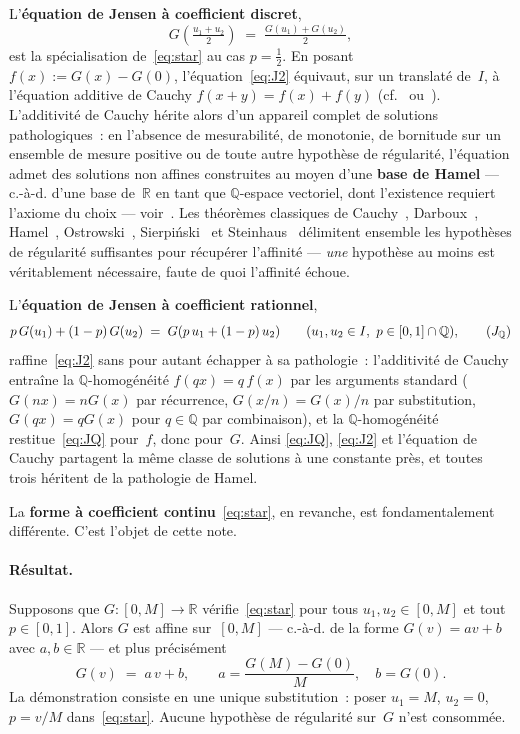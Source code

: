 \documentclass[11pt,a4paper]{amsart}
\newcommand{\R}{\mathbb R}
\newcommand{\Q}{\mathbb Q}
\begin{document}
L'\textbf{équation de Jensen à coefficient discret},
\begin{equation}
G\!\left(\tfrac{u_1 + u_2}{2}\right) \;=\;
\tfrac{G(u_1) + G(u_2)}{2},
\tag{$J_2$}\label{eq:J2}
\end{equation}
est la spécialisation de~\eqref{eq:star} au cas $p = \tfrac12$. En posant
$f(x) := G(x) - G(0)$, l'équation~\eqref{eq:J2} équivaut, sur un translaté
de~$I$, à l'équation additive de Cauchy $f(x + y) = f(x) + f(y)$
(cf.~\cite{Aczel1966} ou~\cite{Kuczma2009}). L'additivité de Cauchy hérite
alors d'un appareil complet de solutions pathologiques~: en l'absence de
mesurabilité, de monotonie, de bornitude sur un ensemble de mesure positive
ou de toute autre hypothèse de régularité, l'équation admet des solutions
non affines construites au moyen d'une \textbf{base de Hamel} --- c.-à-d.
d'une base de~$\R$ en tant que $\Q$-espace vectoriel, dont l'existence
requiert l'axiome du choix --- voir~\cite{Hamel1905}. Les théorèmes
classiques de Cauchy~\cite{Cauchy1821}, Darboux~\cite{Darboux1875},
Hamel~\cite{Hamel1905}, Ostrowski~\cite{Ostrowski1929},
Sierpiński~\cite{Sierpinski1920} et Steinhaus~\cite{Steinhaus1920}
délimitent ensemble les hypothèses de régularité suffisantes pour récupérer
l'affinité --- \emph{une} hypothèse au moins est véritablement nécessaire,
faute de quoi l'affinité échoue.

L'\textbf{équation de Jensen à coefficient rationnel},
\begin{equation}
p\,G(u_1) + (1-p)\,G(u_2) \;=\; G(p\,u_1 + (1-p)\,u_2)
\qquad (u_1,u_2\in I,\ p\in[0,1]\cap\Q),
\tag{$J_{\Q}$}\label{eq:JQ}
\end{equation}
raffine~\eqref{eq:J2} sans pour autant échapper à sa pathologie~:
l'additivité de Cauchy entraîne la $\Q$-homogénéité $f(qx) = q\,f(x)$ par
les arguments standard ($G(nx) = nG(x)$ par récurrence, $G(x/n) = G(x)/n$
par substitution, $G(qx) = qG(x)$ pour $q\in\Q$ par combinaison), et la
$\Q$-homogénéité restitue~\eqref{eq:JQ} pour~$f$, donc pour~$G$. Ainsi
\eqref{eq:JQ}, \eqref{eq:J2} et l'équation de Cauchy partagent la même
classe de solutions à une constante près, et toutes trois héritent de la
pathologie de Hamel.

La \textbf{forme à coefficient continu}~\eqref{eq:star}, en revanche, est
fondamentalement différente. C'est l'objet de cette note.

\paragraph{Résultat.}
Supposons que $G\colon[0,M]\to\R$ vérifie~\eqref{eq:star} pour tous
$u_1,u_2\in[0,M]$ et tout $p\in[0,1]$. Alors $G$ est affine sur~$[0,M]$
--- c.-à-d. de la forme $G(v) = av + b$ avec $a,b\in\R$ --- et plus
précisément
\[
G(v) \;=\; a\,v + b,
\qquad a = \frac{G(M) - G(0)}{M},\quad b = G(0).
\]
La démonstration consiste en une unique substitution~: poser $u_1 = M$,
$u_2 = 0$, $p = v/M$ dans~\eqref{eq:star}. Aucune hypothèse de régularité
sur~$G$ n'est consommée.
\end{document}
